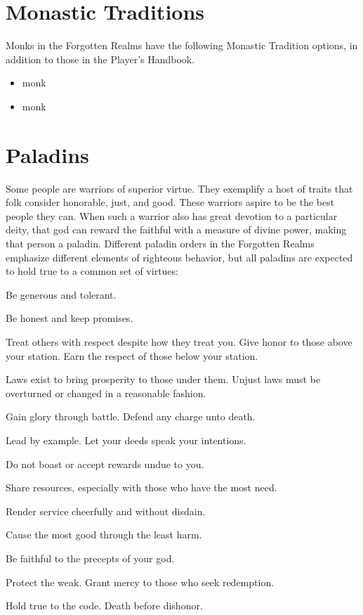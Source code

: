 \documentclass[10pt,a4paper,twoside,twocolumn,openany,bg=print,nodeprecatedcode]{dndbook}
\begin{document}
\section{Monastic Traditions}
Monks in the Forgotten Realms have the following Monastic Tradition options, in addition to those in the Player's Handbook.

\begin{itemize}
\item monk
\item monk
\end{itemize}

\section{Paladins}
Some people are warriors of superior virtue. They exemplify a host of traits that folk consider honorable, just, and good. These warriors aspire to be the best people they can. When such a warrior also has great devotion to a particular deity, that god can reward the faithful with a measure of divine power, making that person a paladin.
Different paladin orders in the Forgotten Realms emphasize different elements of righteous behavior, but all paladins are expected to hold true to a common set of virtues:

\begin{description}[nolistsep]
\item[Liberality]
Be generous and tolerant.
\item[Good faith]
Be honest and keep promises.
\item[Courtesy]
Treat others with respect despite how they treat you. Give honor to those above your station. Earn the respect of those below your station.
\item[Lawfulness]
Laws exist to bring prosperity to those under them. Unjust laws must be overturned or changed in a reasonable fashion.
\item[Bravery]
Gain glory through battle. Defend any charge unto death.
\item[Pride in one's actions]
Lead by example. Let your deeds speak your intentions.
\item[Humility in one's deeds]
Do not boast or accept rewards undue to you.
\item[Unselfishness]
Share resources, especially with those who have the most need.
\item[Good-temperedness]
Render service cheerfully and without disdain.
\item[Wisdom]
Cause the most good through the least harm.
\item[Piety]
Be faithful to the precepts of your god.
\item[Kindness]
Protect the weak. Grant mercy to those who seek redemption.
\item[Honor]
Hold true to the code. Death before dishonor.
\end{description}
\end{document}

